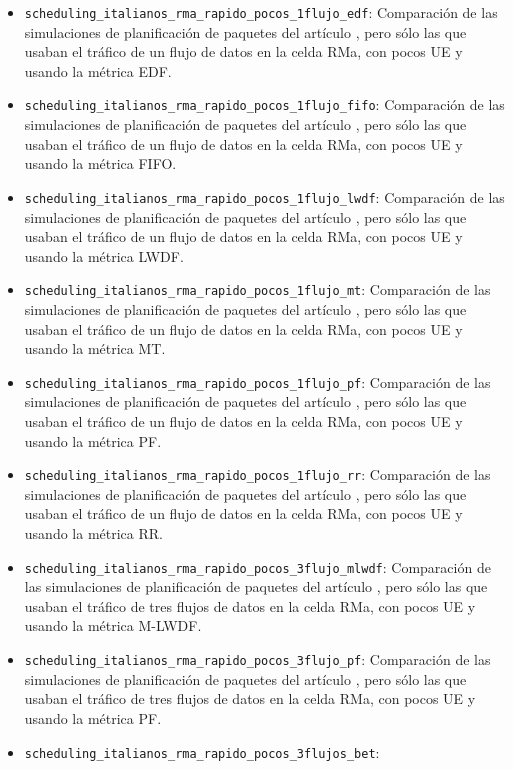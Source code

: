 \documentclass[12pt]{report} %
\begin{document}
\begin{itemize}
pero sólo las que usaban el tráfico de un flujo de datos en la celda RMa, con pocos UE y usando la métrica BET.
\item \verb|scheduling_italianos_rma_rapido_pocos_1flujo_edf|:
Comparación de las simulaciones de planificación de paquetes del artículo \cite{RefWorks:26},
pero sólo las que usaban el tráfico de un flujo de datos en la celda RMa, con pocos UE y usando la métrica EDF.
\item \verb|scheduling_italianos_rma_rapido_pocos_1flujo_fifo|:
Comparación de las simulaciones de planificación de paquetes del artículo \cite{RefWorks:26},
pero sólo las que usaban el tráfico de un flujo de datos en la celda RMa, con pocos UE y usando la métrica FIFO.
\item \verb|scheduling_italianos_rma_rapido_pocos_1flujo_lwdf|:
Comparación de las simulaciones de planificación de paquetes del artículo \cite{RefWorks:26},
pero sólo las que usaban el tráfico de un flujo de datos en la celda RMa, con pocos UE y usando la métrica LWDF.
\item \verb|scheduling_italianos_rma_rapido_pocos_1flujo_mt|:
Comparación de las simulaciones de planificación de paquetes del artículo \cite{RefWorks:26},
pero sólo las que usaban el tráfico de un flujo de datos en la celda RMa, con pocos UE y usando la métrica MT.
\item \verb|scheduling_italianos_rma_rapido_pocos_1flujo_pf|:
Comparación de las simulaciones de planificación de paquetes del artículo \cite{RefWorks:26},
pero sólo las que usaban el tráfico de un flujo de datos en la celda RMa, con pocos UE y usando la métrica PF.
\item \verb|scheduling_italianos_rma_rapido_pocos_1flujo_rr|:
Comparación de las simulaciones de planificación de paquetes del artículo \cite{RefWorks:26},
pero sólo las que usaban el tráfico de un flujo de datos en la celda RMa, con pocos UE y usando la métrica RR.
\item \verb|scheduling_italianos_rma_rapido_pocos_3flujo_mlwdf|:
Comparación de las simulaciones de planificación de paquetes del artículo \cite{RefWorks:26},
pero sólo las que usaban el tráfico de tres flujos de datos en la celda RMa, con pocos UE y usando la métrica M-LWDF.
\item \verb|scheduling_italianos_rma_rapido_pocos_3flujo_pf|:
Comparación de las simulaciones de planificación de paquetes del artículo \cite{RefWorks:26},
pero sólo las que usaban el tráfico de tres flujos de datos en la celda RMa, con pocos UE y usando la métrica PF.
\item \verb|scheduling_italianos_rma_rapido_pocos_3flujos_bet|:

\end{itemize}
\end{document}
